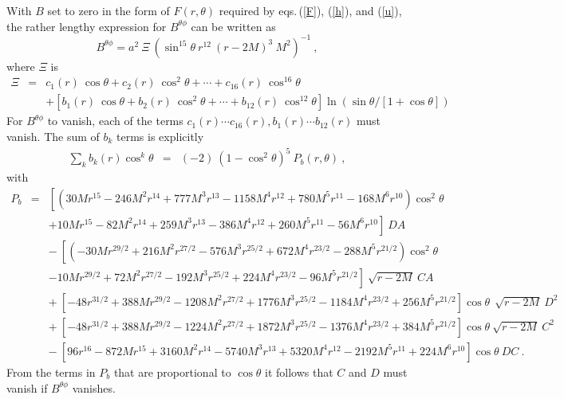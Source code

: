 With $B$ set to zero in the form of $F(r,\theta)$ required by eqs.\,(\ref{F}), (\ref{h}),
and (\ref{u}), the rather lengthy expression for $B^{\theta\phi}$ can 
be written as
\begin{equation}
B^{\theta \phi} = a^2 \: \Xi \: \left(\sin^{15}\theta \:  r^{12}\:
(r-2M)^{3}\: M^2 
\right)^{-1}\ ,
\end{equation}
where $\Xi$ is
\begin{eqnarray}
\Xi&=& c_{1}(r) \: \cos\theta + c_{2}(r) \: \cos^2\theta + \cdots + 
c_{16}(r) \: \cos^{16}\theta \nonumber\\&&
+
\left[b_{1}(r) \: \cos\theta + b_{2}(r) \: \cos^2\theta + \cdots + 
b_{12}(r) \: \cos^{12}\theta
\right]\ln\left(\sin\theta/[1+\cos\theta]\right)
\label{INDEXP}
\end{eqnarray} 
For $B^{\theta \phi}$ to vanish, each of the terms $c_{1}(r)\cdots
c_{16}(r), b_{1}(r)\cdots b_{12}(r)$ must vanish. The sum of $b_k$
terms is explicitly
\begin{eqnarray}
\sum_{k}b_{k}(r)\cos^{k}\theta&=& (-2)\:(1-\cos^2\theta)^5
\:P_{b}(r,\theta)\nonumber\ ,
\end{eqnarray}
with
\begin{eqnarray}
P_b&=&\left[\left(30Mr^{15}-246M^{2}r^{14}+777M^{3}r^{13}
-1158M^{4}r^{12}+780M^{5}r^{11}-168M^{6}r^{10}\right)\cos^2\theta\right. \nonumber\\&&
\left.+10Mr^{15}-82M^{2}r^{14}+259M^{3}r^{13}-386M^{4}r^{12}+260M^{5}r^{11}
-56M^{6}r^{10}\right] \: DA \nonumber\\
&&- \: \left[\left(-30Mr^{29/2}+216M^{2}r^{27/2}-576M^{3}r^{25/2}
+672M^{4}r^{23/2}-288M^{5}r^{21/2}\right)\cos^2\theta\right. \nonumber\\&&
\left.-10Mr^{29/2}+72M^{2}r^{27/2}-192M^{3}r^{25/2}
+224M^{4}r^{23/2}-96M^{5}r^{21/2}\right] \: 
\sqrt{r-2M} \: CA \nonumber\\&&
+ \: [-48r^{31/2}+388Mr^{29/2}-1208M^{2}r^{27/2}+1776M^{3}r^{25/2}
-1184M^{4}r^{23/2}+256M^{5}r^{21/2}]\cos\theta \: \:
\sqrt{r-2M}  \: D^2  \nonumber\\
&&+ \: [-48r^{31/2}+388Mr^{29/2}-1224M^{2}r^{27/2}+1872M^{3}r^{25/2}
-1376M^{4}r^{23/2}+384M^{5}r^{21/2}]\cos\theta \:
\sqrt{r-2M} \: C^2  \nonumber\\&& -\: 
[96r^{16}-872Mr^{15}+3160M^{2}r^{14}-5740M^{3}r^{13}
+5320M^{4}r^{12}-2192M^{5}r^{11}+224M^{6}r^{10}]\cos\theta\: DC\ .
\end{eqnarray} 
From the terms in $P_b$ that are proportional to $\cos\theta$ it follows 
that $C$ and $D$ must vanish if $B^{\theta \phi}$ vanishes.


